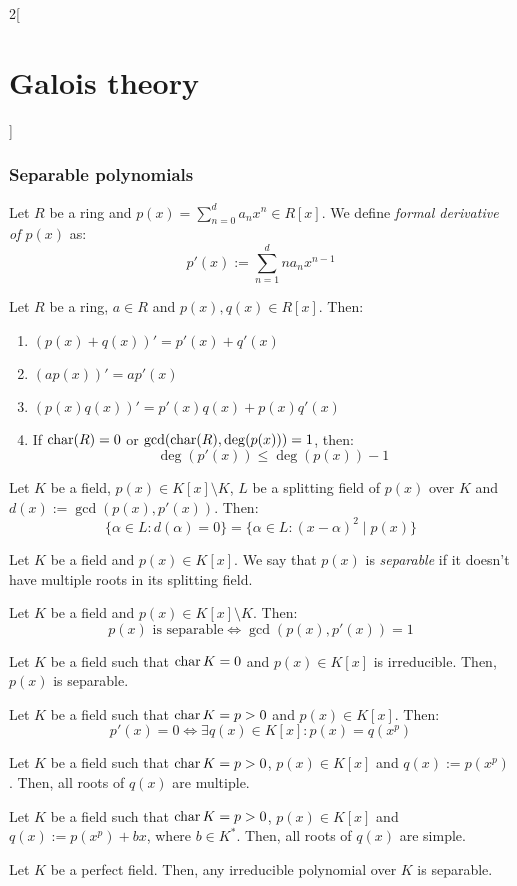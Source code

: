 \documentclass[../../../main.tex]{subfiles}
\begin{document}
\begin{multicols}{2}[\section{Galois theory}]
  \subsubsection{Separable polynomials}
  \begin{definition}
    Let $R$ be a ring and $p(x)=\sum_{n=0}^da_nx^n\in R[x]$. We define \textit{formal derivative of $p(x)$} as: $$p'(x):=\sum_{n=1}^dna_nx^{n-1}$$
  \end{definition}
  \begin{prop}
    Let $R$ be a ring, $a\in R$ and $p(x),q(x)\in R[x]$. Then:
    \begin{enumerate}
      \item ${(p(x)+q(x))}'=p'(x)+q'(x)$
      \item $(ap(x))'=ap'(x)$
      \item $(p(x)q(x))'=p'(x)q(x)+p(x)q'(x)$
      \item If $\operatorname{char}(R)=0$ or $\gcd(\operatorname{char}(R),\deg(p(x)))=1$, then: $$\deg(p'(x))\leq\deg(p(x))-1$$
    \end{enumerate}
  \end{prop}
  \begin{prop}
    Let $K$ be a field, $p(x)\in K[x]\setminus K$, $L$ be a splitting field of $p(x)$ over $K$ and $d(x):=\gcd(p(x),p'(x))$. Then:
    $$\{\alpha\in L:d(\alpha)=0\}=\{\alpha\in L:{(x-\alpha)}^2\mid p(x)\}$$
  \end{prop}
  \begin{definition}
    Let $K$ be a field and $p(x)\in K[x]$. We say that $p(x)$ is \textit{separable} if it doesn't have multiple roots in its splitting field.
  \end{definition}
  \begin{corollary}
    Let $K$ be a field and $p(x)\in K[x]\setminus K$. Then: $$p(x)\text{ is separable}\iff\gcd(p(x),p'(x))=1$$
  \end{corollary}
  \begin{corollary}
    Let $K$ be a field such that $\operatorname{char} K=0$ and $p(x)\in K[x]$ is irreducible. Then, $p(x)$ is separable.
  \end{corollary}
  \begin{lemma}
    Let $K$ be a field such that $\operatorname{char} K=p>0$ and $p(x)\in K[x]$. Then: $$p'(x)=0\iff\exists q(x)\in K[x]:p(x)=q(x^p)$$
  \end{lemma}
  \begin{corollary}
    Let $K$ be a field such that $\operatorname{char} K=p>0$, $p(x)\in K[x]$ and $q(x):=p(x^p)$. Then, all roots of $q(x)$ are multiple.
  \end{corollary}
  \begin{corollary}
    Let $K$ be a field such that $\operatorname{char} K=p>0$, $p(x)\in K[x]$ and $q(x):=p(x^p)+bx$, where $b\in K^*$. Then, all roots of $q(x)$ are simple.
  \end{corollary}
  \begin{theorem}
    Let $K$ be a perfect field. Then, any irreducible polynomial over $K$ is separable.
  \end{theorem}

\end{multicols}
\end{document}
